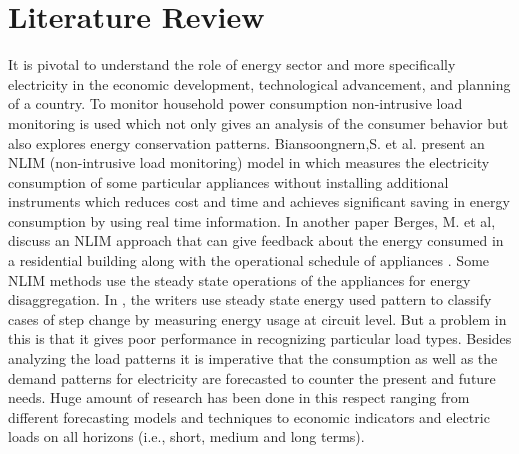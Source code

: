 \documentclass[conference]{IEEEtran}
\begin{document}
\section{Literature Review}
It is pivotal to understand the role of energy sector and more specifically electricity in the economic development, technological advancement, and planning of a country. To monitor household power consumption non-intrusive load monitoring is used which not only gives an analysis of the consumer behavior but also explores energy conservation patterns. Biansoongnern,S. et al. present an NLIM (non-intrusive load monitoring) model in \cite{BIANSOONGNERN2016172} which measures the electricity consumption of some particular appliances without installing additional instruments which reduces cost and time and achieves significant saving in energy consumption by using real time information. In another paper Berges, M. et al, discuss an NLIM approach that can give feedback about the energy consumed in a residential building along with the operational schedule of appliances \cite{articleBerges}. Some NLIM methods use the steady state operations of the appliances for energy disaggregation. In \cite{5582070},
the writers use steady state energy used pattern to classify cases of step change by measuring energy usage at circuit level. But a problem in this is that it gives poor performance in recognizing particular load types. Besides analyzing the load patterns it is imperative that the consumption as well as the demand patterns for electricity are forecasted to counter the present and future needs. Huge amount of research has been done in this respect ranging from different forecasting models and techniques to economic indicators and electric loads on all horizons (i.e., short, medium and long terms). 
\end{document}

